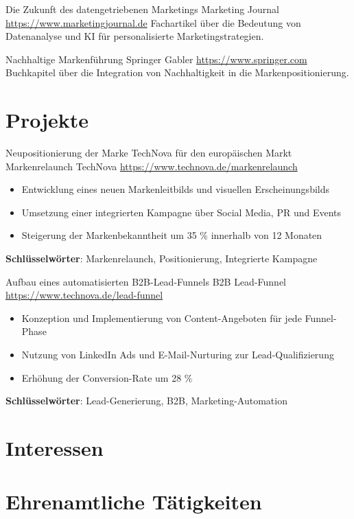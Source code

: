 \documentclass[a4paper, serif, 10pt]{moderncv}
\begin{document}
        {Die Zukunft des datengetriebenen Marketings}
        {Marketing Journal}
        {\url{https://www.marketingjournal.de}}
        {}
        {Fachartikel über die Bedeutung von Datenanalyse und KI für personalisierte Marketingstrategien.}

        {Nachhaltige Markenführung}
        {Springer Gabler}
        {\url{https://www.springer.com}}
        {}
        {Buchkapitel über die Integration von Nachhaltigkeit in die Markenpositionierung.}
\section{Projekte}

        {Neupositionierung der Marke TechNova für den europäischen Markt}
        {Markenrelaunch TechNova}
        {\url{https://www.technova.de/markenrelaunch}}
        {}
        {\begin{itemize}
\item Entwicklung eines neuen Markenleitbilds und visuellen Erscheinungsbilds
\item Umsetzung einer integrierten Kampagne über Social Media, PR und Events
\item Steigerung der Markenbekanntheit um 35 \% innerhalb von 12 Monaten
\end{itemize}
\textbf{Schlüsselwörter}: Markenrelaunch, Positionierung, Integrierte Kampagne}

        {Aufbau eines automatisierten B2B-Lead-Funnels}
        {B2B Lead-Funnel}
        {\url{https://www.technova.de/lead-funnel}}
        {}
        {\begin{itemize}
\item Konzeption und Implementierung von Content-Angeboten für jede Funnel-Phase
\item Nutzung von LinkedIn Ads und E-Mail-Nurturing zur Lead-Qualifizierung
\item Erhöhung der Conversion-Rate um 28 \%
\end{itemize}
\textbf{Schlüsselwörter}: Lead-Generierung, B2B, Marketing-Automation}
\section{Interessen}

\section{Ehrenamtliche Tätigkeiten}
\end{document}
